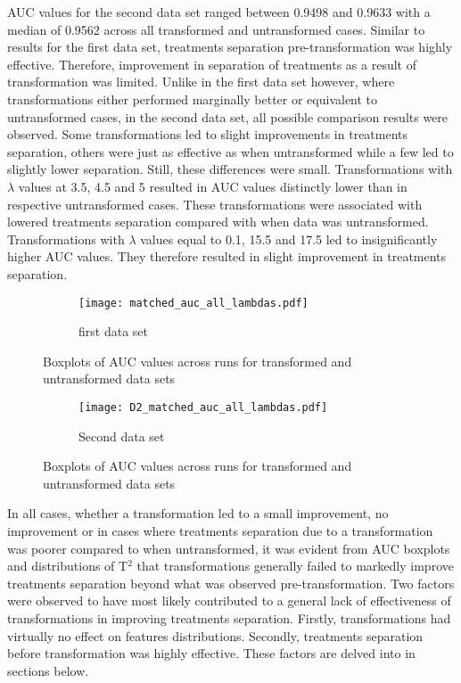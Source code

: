 \documentclass[11pt]{article}
\begin{document}
\par{AUC values for the second data set ranged between 0.9498 and 0.9633 with a median of 0.9562 across all transformed and untransformed cases. Similar to results for the first data set, treatments separation pre-transformation was highly effective. Therefore, improvement in separation of treatments as a result of transformation was limited. Unlike in the first data set however, where transformations either performed marginally better or equivalent to untransformed cases, in the second data set, all possible comparison results were observed. Some transformations led to slight improvements in treatments separation, others were just as effective as when untransformed while a few led to slightly lower separation. Still, these differences were small. Transformations with $\lambda$ values at 3.5, 4.5 and 5 resulted in AUC values distinctly lower than in respective untransformed cases. These transformations were associated with lowered treatments separation compared with when data was untransformed. Transformations with $\lambda$ values equal to 0.1, 15.5 and 17.5 led to insignificantly higher AUC values. They therefore resulted in slight improvement in treatments separation. }

\begin{landscape}
\begin{figure}[ht!]
\centering
\begin{subfigure}{1\textwidth}
\centering
\texttt{[image: matched\_auc\_all\_lambdas.pdf]}
\caption*{first data set}
\end{subfigure}%
\caption{Boxplots of AUC values across runs for transformed and untransformed data sets}
\label{allbox}
\end{figure}
\end{landscape}

\begin{landscape}
\begin{figure}[ht!]
\centering
\ContinuedFloat
\begin{subfigure}{1\textwidth}
\centering
\texttt{[image: D2\_matched\_auc\_all\_lambdas.pdf]}
\caption*{Second data set}
\end{subfigure}%
\caption{Boxplots of AUC values across runs for transformed and untransformed data sets}
\label{allbox}
\end{figure} 
\end{landscape}


\par{In all cases, whether a transformation led to a small improvement, no improvement or in cases where treatments separation due to a transformation was poorer compared to when untransformed, it was evident from AUC boxplots and distributions of T$^2$ that transformations generally failed to markedly improve treatments separation beyond what was observed pre-transformation. Two factors were observed to have most likely contributed to a general lack of effectiveness of transformations in improving treatments separation. Firstly, transformations had virtually no effect on features distributions. Secondly, treatments separation before transformation was highly effective. These factors are delved into in sections below.}
\end{document}
